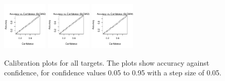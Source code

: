 \documentclass[10pt,article]{memoir}
\begin{document}
\begin{figure}[h!]
\includegraphics[width=0.19\textwidth]{figures/calibration_plots/slc6a2_calib.pdf}
\includegraphics[width=0.19\textwidth]{figures/calibration_plots/slc6a3_calib.pdf}
\includegraphics[width=0.19\textwidth]{figures/calibration_plots/slc6a4_calib.pdf}

    \caption{Calibration plots for all targets. The plots show accuracy against
        confidence, for confidence values 0.05 to 0.95 with a step size of 0.05.}
    \label{fig:calibration_plots_all}
\end{figure}
\end{document}
